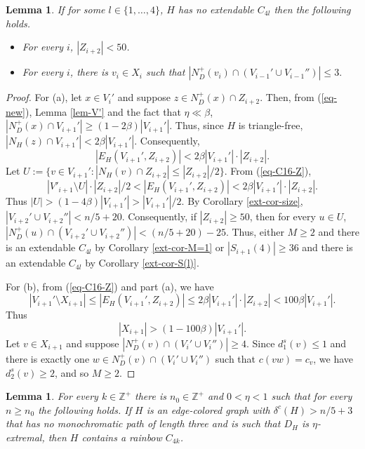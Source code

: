 \documentclass{article}
\newtheorem{lemma}[theorem]{Lemma}
\begin{document}
\begin{lemma}\label{ext-lem-setZ}
If for some $l\in \{1, \dots, 4\}$, $H$ has no extendable $C_{4l}$ then the following holds.
\begin{itemize}
\item[(a)]For every $i$, $|Z_{i+2}|< { 50}$.
\item[(b)] For every $i$, there is $v_i\in X_i$ such that $|N^+_D(v_i)\cap (V_{i-1}'\cup V_{i-1}'')|\leq 3.$
\end{itemize}
\end{lemma}
\begin{proof}
For (a), let $x\in V_i'$ and suppose $z\in N^+_D(x) \cap Z_{i+2}.$ Then, from (\ref{eq-new}), Lemma \ref{lem-V'} and the fact that $\eta\ll \beta$, $|N^+_D(x)\cap V_{i+1}'|\geq (1-2\beta)|V_{i+1}'|$. Thus, since $H$ is triangle-free, $|N_H(z)\cap V_{i+1}'|< 2\beta |V_{i+1}'|$. Consequently,
\begin{equation}\label{eq-C16-Z}
|E_H(V_{i+1}', Z_{i+2})|< 2\beta |V_{i+1}'|\cdot |Z_{i+2}|.
\end{equation}
Let $U:=\{v\in V_{i+1}' : |N_H(v)\cap Z_{i+2}|\leq |Z_{i+2}|/2\}.$ From (\ref{eq-C16-Z}), $$|V'_{i+1}\setminus U|\cdot  |Z_{i+2}|/2 < |E_H(V_{i+1}', Z_{i+2})|< 2\beta |V_{i+1}'|\cdot |Z_{i+2}|.$$ Thus $|U|>(1-4\beta)|V_{i+1}'|>|V_{i+1}'|/2.$  By Corollary  \ref{ext-cor-size}, $|V_{i+2}'\cup V_{i+2}''|< n/5 +20$. Consequently, if $|Z_{i+2}|\geq 50$, then for every $u\in U$, $|N^+_D(u) \cap (V_{i+2}'\cup V_{i+2}'')|<(n/5+20)- { 25}$. Thus, either $M\geq 2$ and there is an extendable $C_{4l}$ by Corollary \ref{ext-cor-M=1} or $|S_{i+1}(4)|\geq 36$ and there is an extendable $C_{4l}$ by Corollary \ref{ext-cor-S(l)}.

For (b), from (\ref{eq-C16-Z}) and part (a), we have
$$|V_{i+1}'\setminus X_{i+1}|\leq |E_H(V_{i+1}', Z_{i+2})| \leq  2\beta |V_{i+1}'|\cdot |Z_{i+2}|< 100 \beta |V_{i+1}'|.$$
Thus \begin{equation}|X_{i+1}|>(1-100\beta)|V_{i+1}'|.
\end{equation} 
Let $v\in X_{i+1}$ and suppose $|N^+_D(v)\cap (V_{i}'\cup V_{i}'')|\geq 4$. Since $d^s_1(v)\leq 1$ and there is exactly one $w\in N^+_D(v)\cap (V_{i}'\cup V_{i}'')$ such that $c(vw)=c_v$, we have $d^s_2(v)\geq 2$, and so $M\geq 2$.%
\end{proof}
\begin{lemma}\label{thm-general}
For every $k\in \mathbb{Z}^+$ there is $n_0\in \mathbb{Z}^+$ and $0<\eta<1$ such that for every $n\geq n_0$ the following holds. If $H$ is an edge-colored graph with $\delta^c(H)>n/5 +3$ that has no monochromatic path of length three and is such that $D_H$ is $\eta$-extremal, then $H$ contains a rainbow $C_{4k}$.
\end{lemma}
\end{document}
